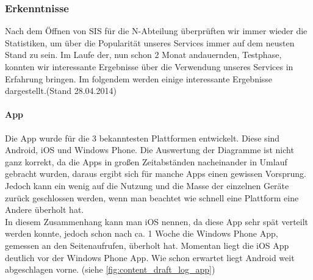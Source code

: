 \subsubsection{Erkenntnisse} \label{sec:content_draft_log_erkenn}
%
Nach dem Öffnen von SIS für die N-Abteilung überprüften wir immer wieder die Statistiken, um über die Popularität unseres Services immer auf dem neusten Stand zu sein. Im Laufe der, nun schon 2 Monat andauernden, Testphase, konnten wir interessante Ergebnisse über die Verwendung unseres Services in Erfahrung bringen. Im folgendem werden einige interessante Ergebnisse dargestellt.(Stand 28.04.2014)\\

\paragraph{App\\}
Die App wurde für die 3 bekanntesten Plattformen entwickelt. Diese sind Android, iOS und Windows Phone. Die Auswertung der Diagramme ist nicht ganz korrekt, da die Apps in großen Zeitabständen nacheinander in Umlauf gebracht wurden, daraus ergibt sich für manche Apps einen gewissen Vorsprung. Jedoch kann ein wenig auf die Nutzung und die Masse der einzelnen Geräte zurück geschlossen werden, wenn man beachtet wie schnell eine Plattform eine Andere überholt hat.\\
In diesem Zusammenhang kann man iOS nennen, da diese App sehr spät verteilt werden konnte, jedoch schon nach ca. 1 Woche die Windows Phone App, gemessen an den Seitenaufrufen, überholt hat. Momentan liegt die iOS App deutlich vor der Windows Phone App. Wie schon erwartet liegt Android weit abgeschlagen vorne. (siehe \autoref{fig:content_draft_log_app})


